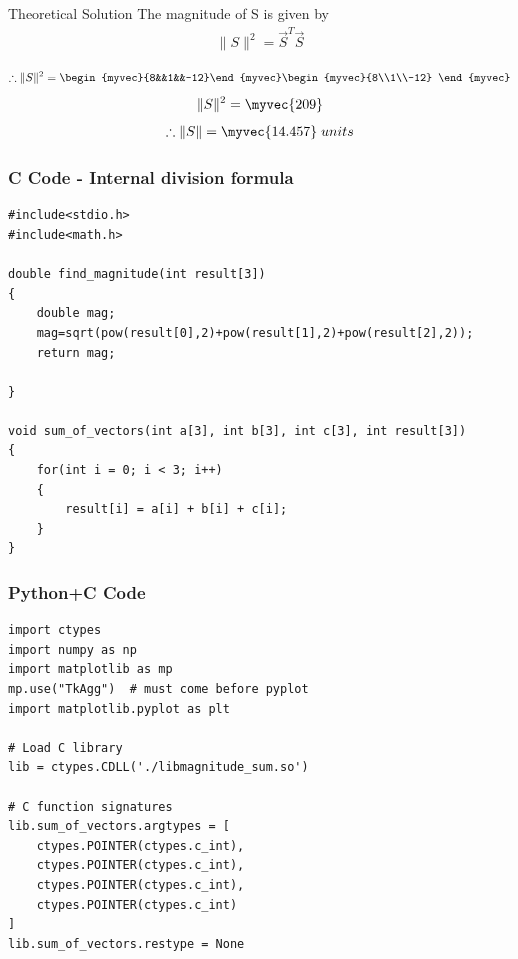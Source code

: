 \documentclass{beamer}
\begin{document}
\begin{frame}{Theoretical Solution}
The magnitude of S is given by \\
\begin{align}
    \|S\|^2=\vec{S}^T\vec{S}
\end{align}

\begin{align}
      \therefore\|S\|^2=\begin{myvec}{8&&1&&-12}\end{myvec}\begin{myvec}{8\\1\\-12}
      \end{myvec}
\end{align}
\begin{align}
    \|S\|^2=\myvec{209}
\end{align}
\begin{align}
    \therefore\|S\|=\myvec{14.457} \;units
\end{align}
\end{frame}

\begin{frame}[fragile]
    \frametitle{C Code - Internal division formula}

    \begin{lstlisting}
#include<stdio.h>
#include<math.h>

double find_magnitude(int result[3])
{
	double mag;
	mag=sqrt(pow(result[0],2)+pow(result[1],2)+pow(result[2],2));
	return mag;

}

void sum_of_vectors(int a[3], int b[3], int c[3], int result[3])
{
    for(int i = 0; i < 3; i++)
    {
        result[i] = a[i] + b[i] + c[i];
    }
}
    \end{lstlisting}
\end{frame}

\begin{frame}[fragile]
    \frametitle{Python+C Code}
    \begin{lstlisting}
import ctypes
import numpy as np
import matplotlib as mp
mp.use("TkAgg")  # must come before pyplot
import matplotlib.pyplot as plt

# Load C library
lib = ctypes.CDLL('./libmagnitude_sum.so')

# C function signatures
lib.sum_of_vectors.argtypes = [
    ctypes.POINTER(ctypes.c_int), 
    ctypes.POINTER(ctypes.c_int), 
    ctypes.POINTER(ctypes.c_int), 
    ctypes.POINTER(ctypes.c_int)
]
lib.sum_of_vectors.restype = None




    \end{lstlisting}
\end{frame}
\end{document}
